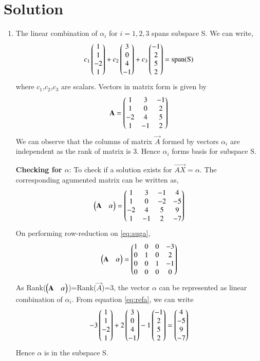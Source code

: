 \documentclass[journal,12pt,twocolumn]{IEEEtran}
\begin{document}
\section{Solution}
\begin{enumerate}
\item The linear combination of $\alpha_i$ for $i=1,2,3$ spans subspace S. We can write,
\begin{align}
c_1\begin{pmatrix}1\\1\\-2\\1\end{pmatrix}+c_2\begin{pmatrix}3\\0\\4\\-1\end{pmatrix}+c_3\begin{pmatrix}-1\\2\\5\\2\end{pmatrix}=\text{span(S)}
\end{align}
where $c_1$,$c_2$,$c_3$ are scalars.
Vectors in matrix form is given by
\begin{align}
\mathbf{A}=\begin{pmatrix}1&3&-1\\1&0&2\\-2&4&5\\1&-1&2\end{pmatrix}
\end{align}
We can observe that the columns of matrix $\vec{A}$ formed by vectors $\alpha_i$ are independent as the rank of matrix is 3. Hence $\alpha_i$ forms basis for subspace S.

\textbf{Checking for $\alpha$}:
To check if a solution exists for $\vec{AX}=\alpha$. The corresponding agumented matrix can be written as,
\begin{align} \label{eq:auga}
\begin{pmatrix}\mathbf{A}&\alpha\end{pmatrix}=\begin{pmatrix}1&3&-1&4\\1&0&-2&-5\\-2&4&5&9\\1&-1&2&-7\end{pmatrix}
\end{align}
On performing row-reduction on \eqref{eq:auga}, 
\begin{align}\label{eq:refa}
\begin{pmatrix}\mathbf{A}&\alpha\end{pmatrix}=\begin{pmatrix}1&0&0&-3\\0&1&0&2\\0&0&1&-1\\0&0&0&0\end{pmatrix}
\end{align}
As Rank($\begin{pmatrix}\mathbf{A}&\alpha\end{pmatrix}$)=Rank($\vec{A}$)=3, the vector $\alpha$ can be represented as linear combination of $\alpha_i$. From equation \eqref{eq:refa}, we can write
\begin{align}
-3\begin{pmatrix}1\\1\\-2\\1\end{pmatrix}+2\begin{pmatrix}3\\0\\4\\-1\end{pmatrix}-1\begin{pmatrix}-1\\2\\5\\2\end{pmatrix}=\begin{pmatrix}4\\-5\\9\\-7\end{pmatrix}
\end{align}
Hence $\alpha$ is in the subspace S.


\end{enumerate}
\end{document}
